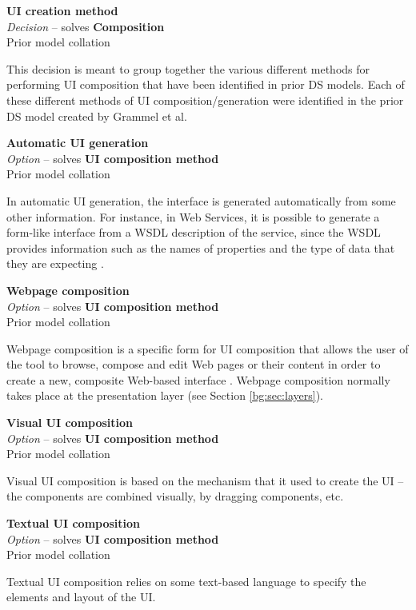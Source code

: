 \textbf{UI creation method} \\ \emph{Decision} -- solves \textbf{Composition} \\ Prior model collation

This decision is meant to group together the various different methods for performing UI composition that have been identified in prior DS models. Each of these different methods of UI composition/generation were identified in the prior DS model created by Grammel et al. \cite{Grammel2010}

\textbf{Automatic UI generation} \\ \emph{Option} -- solves \textbf{UI composition method} \\ Prior model collation \cite{Grammel2010}

In automatic UI generation, the interface is generated automatically from some other information. For instance, in Web Services, it is possible to generate a form-like interface from a WSDL description of the service, since the WSDL provides information such as the names of properties and the type of data that they are expecting \cite{Grammel2010}.

\textbf{Webpage composition} \\ \emph{Option} -- solves \textbf{UI composition method} \\ Prior model collation \cite{Minhas2012}

Webpage composition is a specific form for UI composition that allows the user of the tool to browse, compose and edit Web pages or their content in order to create a new, composite Web-based interface \cite{Grammel2010}. Webpage composition normally takes place at the presentation layer (see Section \ref{bg:sec:layers}).

\textbf{Visual UI composition} \\ \emph{Option} -- solves \textbf{UI composition method} \\ Prior model collation \cite{Grammel2010}

Visual UI composition is based on the mechanism that it used to create the UI -- the components are combined visually, by dragging components, etc.

\textbf{Textual UI composition} \\ \emph{Option} -- solves \textbf{UI composition method} \\ Prior model collation \cite{Grammel2010}

Textual UI composition relies on some text-based language to specify the elements and layout of the UI.

